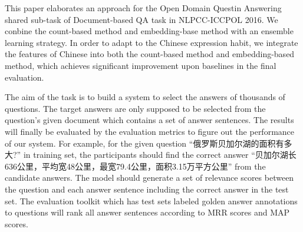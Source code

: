 \documentclass{llncs}
\begin{document}
This paper {\color{red}elaborates} an approach for the Open Domain Questin Answering shared sub-task of Document-based QA task in NLPCC-ICCPOL 2016. We conbine the count-based method and embedding-base method with {\color{red}an} ensemble learning strategy. In order to adapt to the Chinese expression habit, we integrate the features of Chinese into both the count-based method and embedding-based method, which achieves significant improvement upon baselines in the final evaluation.


The aim of the task is to build a system {\color{red}to select} the answers of thousands of questions. The target answers are only supposed to be selected from the question's given document {\color{red}which} contains a set of answer sentences. 
The results will finally be evaluated by the evaluation metrics to figure out the performance of our system. 
For example, for the given question ``俄罗斯贝加尔湖的面积有多大?'' in training set, the participants should find the correct answer ``贝加尔湖长636公里，平均宽48公里，最宽79.4公里，面积3.15万平方公里'' from the candidate answers. The model should generate a set of relevance scores between the question and each answer sentence including the correct answer in the test set. The evaluation toolkit which has test sets labeled golden answer annotations to questions will rank all answer sentences according to MRR scores and MAP scores. 

\end{document}
